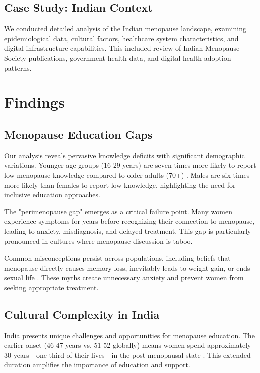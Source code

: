 \documentclass[letterpaper]{article} %
\begin{document}
\subsection{Case Study: Indian Context}

We conducted detailed analysis of the Indian menopause landscape, examining epidemiological data, cultural factors, healthcare system characteristics, and digital infrastructure capabilities. This included review of Indian Menopause Society publications, government health data, and digital health adoption patterns.

\section{Findings}

\subsection{Menopause Education Gaps}

Our analysis reveals pervasive knowledge deficits with significant demographic variations. Younger age groups (16-29 years) are seven times more likely to report low menopause knowledge compared to older adults (70+) \cite{mdpi2025knowledge}. Males are six times more likely than females to report low knowledge, highlighting the need for inclusive education approaches.

The "perimenopause gap" emerges as a critical failure point. Many women experience symptoms for years before recognizing their connection to menopause, leading to anxiety, misdiagnosis, and delayed treatment. This gap is particularly pronounced in cultures where menopause discussion is taboo.

Common misconceptions persist across populations, including beliefs that menopause directly causes memory loss, inevitably leads to weight gain, or ends sexual life \cite{webmd2023myths}. These myths create unnecessary anxiety and prevent women from seeking appropriate treatment.

\subsection{Cultural Complexity in India}

India presents unique challenges and opportunities for menopause education. The earlier onset (46-47 years vs. 51-52 globally) means women spend approximately 30 years—one-third of their lives—in the post-menopausal state \cite{ijogr2023knowledge}. This extended duration amplifies the importance of education and support.
\end{document}
